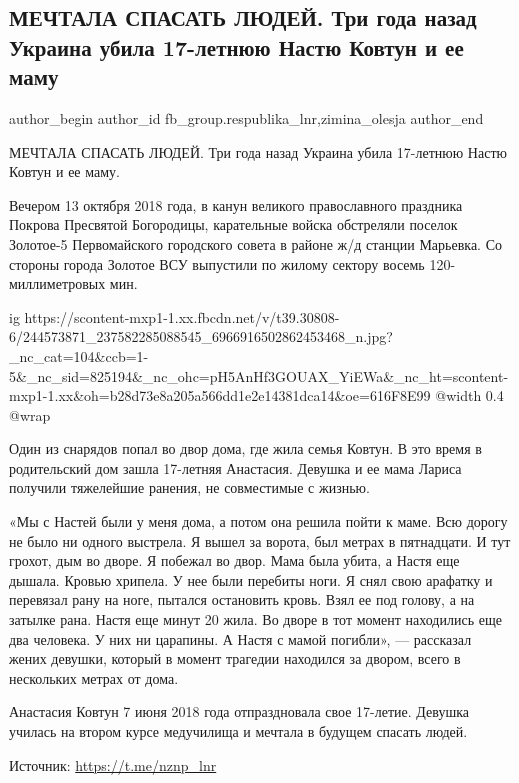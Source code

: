  
 
 
 
 
 
\subsection{МЕЧТАЛА СПАСАТЬ ЛЮДЕЙ. Три года назад Украина убила 17-летнюю Настю Ковтун и ее маму}
\label{sec:13_10_2021.fb.fb_group.respublika_lnr.1.kovtun_nastia_murder}
 
\ifcmt
 author_begin
   author_id fb_group.respublika_lnr,zimina_olesja
 author_end
\fi

МЕЧТАЛА СПАСАТЬ ЛЮДЕЙ. Три года назад Украина убила 17-летнюю Настю Ковтун и ее
маму.

Вечером 13 октября 2018 года, в канун великого православного праздника Покрова
Пресвятой Богородицы, карательные войска обстреляли поселок Золотое-5
Первомайского городского совета в районе ж/д станции Марьевка. Со стороны
города Золотое ВСУ выпустили по жилому сектору восемь 120-миллиметровых мин. 

\ifcmt
  ig https://scontent-mxp1-1.xx.fbcdn.net/v/t39.30808-6/244573871_237582285088545_6966916502862453468_n.jpg?_nc_cat=104&ccb=1-5&_nc_sid=825194&_nc_ohc=pH5AnHf3GOUAX_YiEWa&_nc_ht=scontent-mxp1-1.xx&oh=b28d73e8a205a566dd1e2e14381dca14&oe=616F8E99
  @width 0.4
  @wrap \parpic[r]
\fi

Один из снарядов попал во двор дома, где жила семья Ковтун. В это время в
родительский дом зашла 17-летняя Анастасия. Девушка и ее мама Лариса получили
тяжелейшие ранения, не совместимые с жизнью. 

«Мы с Настей были у меня дома, а потом она решила пойти к маме. Всю дорогу не
было ни одного выстрела. Я вышел за ворота, был метрах в пятнадцати. И тут
грохот, дым во дворе. Я побежал во двор. Мама была убита, а Настя еще дышала.
Кровью хрипела. У нее были перебиты ноги. Я снял свою арафатку и перевязал рану
на ноге, пытался остановить кровь. Взял ее под голову, а на затылке рана. Настя
еще минут 20 жила. Во дворе в тот момент находились еще два человека. У них ни
царапины. А Настя с мамой погибли», — рассказал жених девушки, который в момент
трагедии находился за двором, всего в нескольких метрах от дома.

Анастасия Ковтун 7 июня 2018 года отпраздновала свое 17-летие. Девушка училась
на втором курсе медучилища и мечтала в будущем спасать людей.

Источник:  \url{https://t.me/nznp_lnr}

